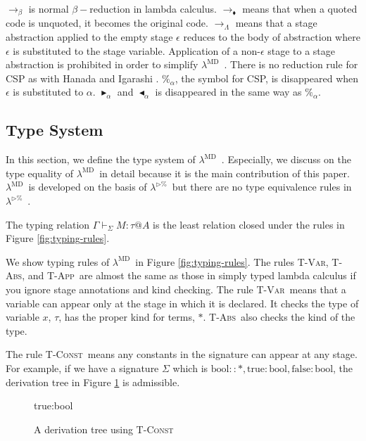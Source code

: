 \documentclass[runningheads]{llncs}
\newcommand{\LTP}{$\lambda^{\triangleright\%}$\ }
\newcommand{\LMD}{$\lambda^{\textrm{MD}}$\ }
\newcommand{\G}{\Gamma}
\newcommand{\V}{\vdash_\Sigma}
\newcommand{\TB}{\blacktriangleright}
\newcommand{\TBL}{\blacktriangleleft}
\newcommand{\TConst}{\textsc{T-Const}}
\newcommand{\TVar}{\textsc{T-Var}}
\newcommand{\TAbs}{\textsc{T-Abs}}
\newcommand{\TApp}{\textsc{T-App}}
\newcommand{\ID}[1]{\infer[]{#1}{\vdots}}
\begin{document}
$\longrightarrow_\beta$ is normal $\beta-$reduction in lambda calculus.
$\longrightarrow_\blacklozenge$ means that when a quoted code is unquoted, it becomes the original code.
$\longrightarrow_\Lambda$ means that a stage abstraction applied to the empty stage $\epsilon$ reduces to the body of abstraction
where $\epsilon$ is substituted to the stage variable.
Application of a non-$\epsilon$ stage to a stage abstraction is prohibited in order to simplify \LMD.
There is no reduction rule for CSP as with Hanada and Igarashi \cite{Hanada2014}.
$\%_\alpha$, the symbol for CSP, is disappeared when $\epsilon$ is substituted to $\alpha$.
$\TB_\alpha$ and $\TBL_\alpha$ is disappeared in the same way as $\%_\alpha$.

\subsection{Type System}


In this section, we define the type system of \LMD.
Especially, we discuss on the type equality of \LMD in detail
because it is the main contribution of this paper.
\LMD is developed on the basis of \LTP but there are no type equivalence rules in \LTP.

\begin{definition}[Typing]
    The typing relation $ \G \V M : \tau @ A $ is the least relation closed under the rules in Figure \ref{fig:typing-rules}.
\end{definition}


We show typing rules of \LMD in Figure \ref{fig:typing-rules}.
The rules \TVar , \TAbs, and \TApp\ are almost the same as those in simply typed lambda calculus 
if you ignore stage annotations and kind checking.
The rule \TVar\ means that a variable can appear only at the stage in which it is declared.
It checks the type of variable $x$, $\tau$, has the proper kind for terms, $*$.
\TAbs\ also checks the kind of the type.

The rule \TConst\ means any constants in the signature can appear at any stage.
For example, if we have a signature $\Sigma$ which is $\textrm{bool} :: *, \textrm{true}: \textrm{bool}, \textrm{false}: \textrm{bool}$,
the derivation tree in Figure \ref{fig:tconst-derivation-tree} is admissible.

\begin{figure}
	\begin{center}
		\begin{minipage}{0.50\hsize}
			\infer[\TConst]
			{\G \V \textrm{true}:\textrm{bool}@\alpha\beta}
			{\textrm{true}:\textrm{bool} \in \Sigma \andalso
				\ID{\G\V\textrm{bool}::*@\alpha\beta} \andalso
			}
			\caption{A derivation tree using \TConst}
			\label{fig:tconst-derivation-tree}
		\end{minipage}
	\end{center}
\end{figure}
\end{document}
